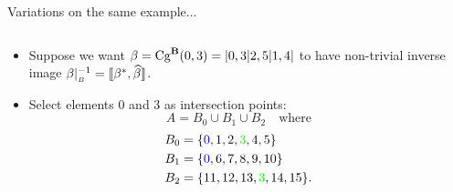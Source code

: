 \begin{frame}[fragile,label=OAEx2,shrink=5]{Variations on the same example... }

  \begin{columns}
    \begin{column}{0.7\textwidth}
      \begin{itemize}
      \item 
        Suppose we want $\beta = \mathrm{Cg}^{\mathbf{B}}(0,3) =| 0, 3 | 2, 5 | 1, 4 |$ to 
        \vskip4pt
        have non-trivial inverse image $\beta|_{_B}^{-1} = \llbracket \beta^*, \widehat{\beta}\rrbracket$.  
        \vskip6pt
      \item<2-> Select elements 0 and 3 as intersection points:
        \[
        A = B_0 \cup B_1 \cup B_2 \quad \text{where}
        \]
        \begin{align*}
          B_0 &= \{{\color{blue} 0}, 1,  2,  {\color{green}3},  4,  5\}\\
          B_1 &= \{{\color{blue} 0}, 6,  7,  8,  9, 10\}\\
          B_2 &= \{11, 12, 13, {\color{green}3}, 14, 15\}.
        \end{align*}
      \end{itemize}
    \end{column}
    \begin{column}{0.3\textwidth}

    \end{column}

  \end{columns}

  \vskip-5mm

  \begin{columns}
    \begin{column}{0.3\textwidth}

\end{column}
\end{columns}
\end{frame}
